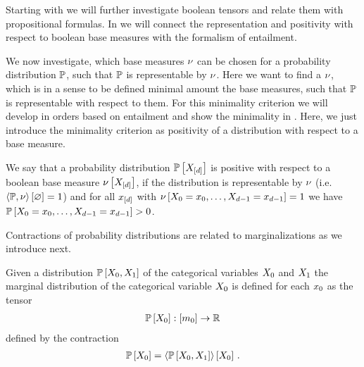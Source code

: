 Starting with  we will further investigate boolean tensors and relate them with propositional formulas.
In  we will connect the representation and positivity with respect to boolean base measures with the formalism of entailment.

We now investigate, which base measures $\nu$ can be chosen for a probability distribution $\mathbb{P}$, such that $\mathbb{P}$ is representable by $\nu$.
Here we want to find a $\nu$, which is in a sense to be defined minimal amount the base measures, such that $\mathbb{P}$ is representable with respect to them.
For this minimality criterion we will develop in  orders based on entailment and show the minimality in .
Here, we just introduce the minimality criterion as positivity of a distribution with respect to a base measure.

\begin{definition}
    \label{def:positivityBaseMeasure}
    We say that a probability distribution $\mathbb{P}\left[X_{[d]}\right]$ is positive with respect to a boolean base measure $\nu\left[X_{[d]}\right]$, if the distribution is representable by $\nu$ (i.e. $\left\langle \mathbb{P},\nu\right\rangle \left[ \varnothing \right]=1$) and for all $x_{[d]}$ with $\nu\left[X_{0}=x_{0},\ldots,X_{d-1}=x_{d-1}\right]=1$ we have $\mathbb{P}\left[X_{0}=x_{0},\ldots,X_{d-1}=x_{d-1}\right]>0$.
\end{definition}




Contractions of probability distributions are related to marginalizations as we introduce next.

\begin{definition}
    \label{def:marginalProbability}
    Given a distribution $\mathbb{P}\left[X_{0},X_{1}\right]$ of the categorical variables $X_{0}$ and $X_{1}$ the marginal distribution of the categorical variable $X_{0}$ is defined for each $x_{0}$ as the tensor
    \begin{align*}
        \mathbb{P}\left[X_{0}\right] : [m_{0}] \rightarrow \mathbb{R}
    \end{align*}
    defined by the contraction
    \begin{align*}
        \mathbb{P}\left[X_{0}\right]
        = \left\langle \mathbb{P}\left[X_{0},X_{1}\right]\right\rangle \left[ X_{0} \right] \, .
    \end{align*}
\end{definition}

